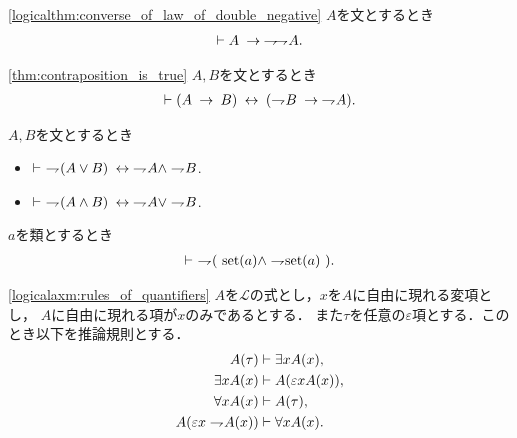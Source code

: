 	\begin{screen}
		\begin{logicalthm}[二重否定の法則の逆が成り立つ]
		\ref{logicalthm:converse_of_law_of_double_negative}
			$A$を文とするとき
			\begin{align}
				\vdash A \hspace{0.25em}\rightarrow\hspace{0.25em} \rightharpoondown\hspace{-0.25em} \rightharpoondown\hspace{-0.25em} A.
			\end{align}
		\end{logicalthm}
	\end{screen}
	
	\begin{screen}
		\begin{logicalthm}[対偶命題は同値]\ref{thm:contraposition_is_true}
			$A,B$を文とするとき
			\begin{align}
				\vdash (A \hspace{0.25em}\rightarrow\hspace{0.25em} B) \hspace{0.25em}\leftrightarrow\hspace{0.25em} (\rightharpoondown\hspace{-0.25em} B \hspace{0.25em}\rightarrow\hspace{0.25em} \rightharpoondown\hspace{-0.25em} A).
			\end{align}
		\end{logicalthm}
	\end{screen}
	
	\begin{screen}
		\begin{logicalthm}[De Morganの法則]
			$A,B$を文とするとき
			\begin{itemize}
				\item $\vdash\ \rightharpoondown\hspace{-0.25em} (A \vee B) \hspace{0.25em}\leftrightarrow\hspace{0.25em} \rightharpoondown\hspace{-0.25em} A \wedge \rightharpoondown\hspace{-0.25em} B$.
			
				\item $\vdash\ \rightharpoondown\hspace{-0.25em} (A \wedge B) \hspace{0.25em}\leftrightarrow\hspace{0.25em} \rightharpoondown\hspace{-0.25em} A \vee \rightharpoondown\hspace{-0.25em} B$.
			\end{itemize}
		\end{logicalthm}
	\end{screen}
	
	\begin{screen}
		\begin{thm}[集合であり真類でもある類は存在しない]
			$a$を類とするとき
			\begin{align}
				\vdash\ \negation (\ \set{a} \wedge \negation \set{a}\ ).
			\end{align}
		\end{thm}
	\end{screen}
	
	\begin{screen}
		\begin{logicalaxm}[量化記号に関する規則]
		\ref{logicalaxm:rules_of_quantifiers}
			$A$を$\mathcal{L}$の式とし，$x$を$A$に自由に現れる変項とし，
			$A$に自由に現れる項が$x$のみであるとする．
			また$\tau$を任意の$\varepsilon$項とする．このとき以下を推論規則とする．
			\begin{align}
				A(\tau) &\vdash \exists x A(x), \\
				\exists x A(x) &\vdash A(\varepsilon x A(x)), \\
				\forall x A(x) &\vdash A(\tau), \\
				A(\varepsilon x \rightharpoondown\hspace{-0.25em} A(x)) &\vdash \forall x A(x).
			\end{align}
		\end{logicalaxm}
	\end{screen}
	
